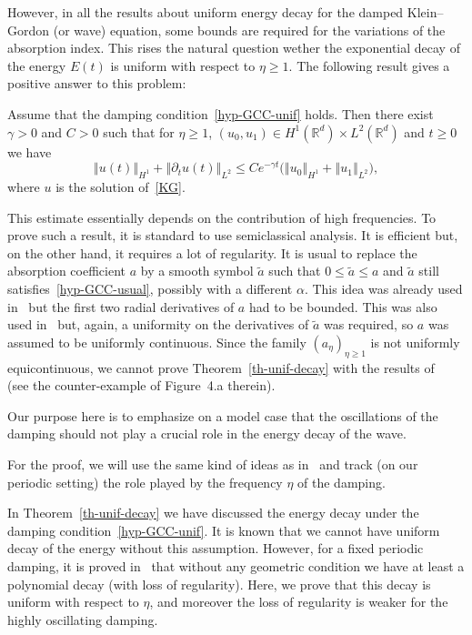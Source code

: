 \documentclass[AHL,Unicode,longabstracts]{cedram}
\newcommand{\nr}[1]{\left\Vert #1\right\Vert}
\renewcommand{\leq}{\leqslant}
\renewcommand{\geq}{\geqslant}
\newcommand{\1}{\mathds 1}
\newcommand{\R}{\mathbb{R}}
\renewcommand{\a}{\alpha}
\newcommand{\g}{\gamma}
\begin{document}
However, in all the results about uniform energy decay for the damped Klein--Gordon (or wave) equation, some bounds are required for the variations of the absorption index. This rises the natural question wether the exponential decay of the energy $E(t)$ is uniform with respect to $\eta \geq 1$. The following result gives a positive answer to this problem:

\begin{theo}\label{th-unif-decay}
Assume that the damping condition~\eqref{hyp-GCC-unif} holds. Then there exist $\g > 0$ and $C > 0$ such that for $\eta \geq 1$, $(u_0,u_1) \in H^1(\R^d) \times L^2(\R^d)$ and $t \geq 0$ we have
\[
\nr{u(t)}_{H^1} + \nr{\partial_t u(t)}_{L^2} \leq C e^{-\g t} \big(\nr{u_0}_{H^1} + \nr{u_1}_{L^2} \big),
\]
where $u$ is the solution of~\eqref{KG}.
\end{theo}

This estimate essentially depends on the contribution of high frequencies. To prove such a result, it is standard to use semiclassical analysis. It is efficient but, on the other hand, it requires a lot of regularity. It is usual to replace the absorption coefficient $a$ by a smooth symbol $\tilde a$ such that $0 \leq \tilde a \leq a$ and $\tilde a$ still satisfies~\eqref{hyp-GCC-usual}, possibly with a different $\a$. This idea was already used in~\cite{royer-mourre} but the first two radial derivatives of $a$ had to be bounded. This was also used in~\cite{BurqJo} but, again, a uniformity on the derivatives of $\tilde a$ was required, so $a$ was assumed to be uniformly continuous. Since the family $(a_\eta)_{\eta \geq 1}$ is not uniformly equicontinuous, we cannot prove Theorem~\ref{th-unif-decay} with the results of~\cite{BurqJo} (see the counter-example of Figure~4.a therein).

Our purpose here is to emphasize on a model case that the oscillations of the damping should not play a crucial role in the energy decay of the wave.

For the proof, we will use the same kind of ideas as in~\cite{BurqJo} and track (on our periodic setting) the role played by the frequency $\eta$ of the damping.%


In Theorem~\ref{th-unif-decay} we have discussed the energy decay under the damping condition~\eqref{hyp-GCC-unif}. It is known that we cannot have uniform decay of the energy without this assumption. However, for a fixed periodic damping, it is proved in~\cite{Wunsch} that without any geometric condition we have at least a polynomial decay (with loss of regularity). Here, we prove that this decay is uniform with respect to $\eta$, and moreover the loss of regularity is weaker for the highly oscillating damping.
\end{document}
